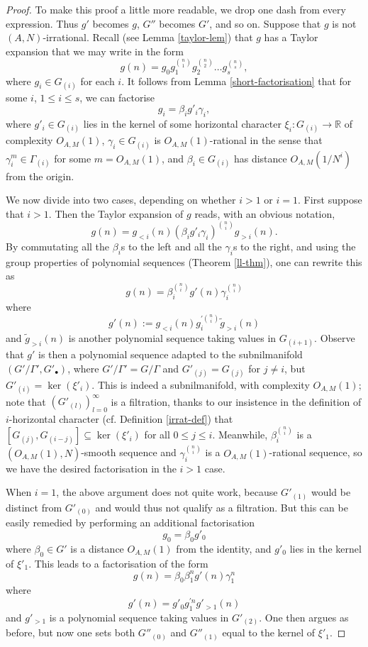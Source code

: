 \documentclass[11pt,reqno]{amsart}
\numberwithin{equation}{section}
\theoremstyle{plain}
\theoremstyle{definition}
\renewcommand{\leq}{\leqslant}
\newcommand\R{\mathbb{R}}
\newcommand\1{{\bf 1}}
\newcommand\2{{\bf 2}}
\begin{document}
\begin{proof} To make this proof a little more readable, we drop one dash from every expression. Thus $g'$ becomes $g$, $G''$ becomes $G'$, and so on. Suppose that $g$ is not $(A,N)$-irrational.  Recall (see Lemma \ref{taylor-lem}) that $g$ has a Taylor expansion that we may write in the form
\[ g(n) = g_0 g_1^{ \binom{n}{1}} g_2^{\binom{n}{2}} \dots g_s^{\binom{n}{s}},\] 
where $g_i \in G_{(i)}$ for each $i$. It follows from Lemma \ref{short-factorisation} that for some $i$, $1 \leq i \leq s$, we can factorise
$$ g_i = \beta_i g'_i \gamma_i,$$
where $g'_i \in G_{(i)}$ lies in the kernel of some horizontal character $\xi_i : G_{(i)} \rightarrow \R$ of complexity $O_{A,M}(1)$, $\gamma_i \in G_{(i)}$ is $O_{A,M}(1)$-rational in the sense that $\gamma_i^m \in \Gamma_{(i)}$ for some $m = O_{A,M}(1)$, and $\beta_i \in G_{(i)}$ has distance $O_{A,M}(1/N^i)$ from the origin.

We now divide into two cases, depending on whether $i>1$ or $i=1$.  First suppose that $i>1$.  Then the Taylor expansion of $g$ reads, with an obvious notation,
$$ g(n) = g_{< i}(n)(\beta_{i} g'_{i} \gamma_{i})^{\binom{n}{i}} g_{>i}(n).$$ By commutating all the $\beta_i$s to the left and all the $\gamma_i$s to the right, and using the group properties of polynomial sequences (Theorem \ref{ll-thm}), one can rewrite this as
$$ g(n) = \beta_{i}^{\binom{n}{i}} g'(n) \gamma_{i}^{\binom{n}{i}}$$
where
$$ g'(n) := g_{< i}(n) g_i^{\prime \binom{n}{i}} \tilde g_{>i}(n)  $$
and $\tilde g_{>i}(n)$ is another polynomial sequence taking values in $G_{(i+1)}$.  Observe that $g'$ is then a polynomial sequence adapted to the subnilmanifold $(G'/\Gamma',G'_\bullet)$, where $G'/\Gamma' = G/\Gamma$ and $G'_{(j)} = G_{(j)}$ for $j \neq i$, but $G'_{(i)} = \ker (\xi'_i)$. This is indeed a subnilmanifold, with complexity $O_{A,M}(1)$; note that $(G'_{(l)})_{l = 0}^{\infty}$ is a filtration, thanks to our insistence in the definition of $i$-horizontal character (cf. Definition \ref{irrat-def}) that $[G_{(j)}, G_{(i-j)}] \subseteq \ker(\xi'_i)$ for all $0 \leq j \leq i$.
Meanwhile, $\beta_{i}^{\binom{n}{i}}$ is a $(O_{A,M}(1),N)$-smooth sequence and $\gamma_{i}^{\binom{n}{i}}$ is a $O_{A,M}(1)$-rational sequence, so we have the desired factorisation in the $i>1$ case.

When $i=1$, the above argument does not quite work, because $G'_{(1)}$ would be distinct from $G'_{(0)}$ and would thus not qualify as a filtration.  But this can be easily remedied by performing an additional factorisation
$$ g_0 = \beta_0 g'_0$$
where $\beta_0 \in G'$ is a distance $O_{A,M}(1)$ from the identity, and $g'_0$ lies in the kernel of $\xi'_1$.  This leads to a factorisation of the form
$$ g(n) = \beta_0 \beta_1^n g'(n) \gamma_1^n$$
where
$$ g'(n) = g'_0 g_1^{\prime n} g'_{>1}(n)$$
and $g'_{>1}$ is a polynomial sequence taking values in $G'_{(2)}$.  One then argues as before, but now one sets both $G''_{(0)}$ and $G''_{(1)}$ equal to the kernel of $\xi'_1$. 
\end{proof}
\end{document}
